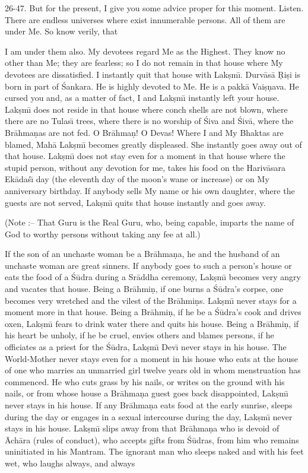 26-47. But for the present, I give you some advice proper for this moment. Listen. There are endless universes where exist innumerable persons. All of them are under Me. So know verily, that

I am under them also. My devotees regard Me as the Highest. They know no other than Me; they are fearless; so I do not remain in that house where My devotees are dissatisfied. I instantly quit that house with Lak\d{s}m\={\i}. Durv\=as\=a \d{R}i\d{s}i is born in part of \'Sankara. He is highly devoted to Me. He is a pakk\=a Vai\d{s}\d{n}ava. He cursed you and, as a matter of fact, I and Lak\d{s}m\={\i} instantly left your house.
Lak\d{s}m\={\i} does not reside in that house where conch shells are not blown, where there are no Tulas\={\i} trees, where there is no worship of \'Siva and \'Siv\=a, where the Br\=ahma\d{n}as are not fed. O Br\=ahma\d{n}! O Devas! Where I and My Bhaktas are blamed, Mah\=a Lak\d{s}m\={\i} becomes greatly displeased. She instantly goes away out of that house. Lak\d{s}m\={\i} does not stay even for a moment in that house where the stupid person, without any devotion for me, takes his food on the Hariv\=asara Ek\=ada\'s\={\i} day (the eleventh day of the moon's wane or increase) or on My anniversary birthday. If anybody sells My name or his own daughter, where the guests are not served, Lak\d{s}m\={\i} quits that house instantly and goes away.

(Note :-- That Guru is the Real Guru, who, being capable, imparts the name of God to worthy persons without taking any fee at all.)

If the son of an unchaste woman be a Br\=ahma\d{n}a, he and the husband of an unchaste woman are great sinners. If anybody goes to such a person's house or eats the food of a \'S\=udra during a Sr\=addha ceremony, Lak\d{s}m\={\i} becomes very angry and vacates that house. Being a Br\=ahmi\d{n}, if one burns a \'S\=udra's corpse, one becomes very wretched and the vilest of the Br\=ahmi\d{n}s. Lak\d{s}m\={\i} never stays for a moment more in that house. Being a Br\=ahmi\d{n}, if he be a \'S\=udra's cook and drives oxen, Lak\d{s}m\={\i} fears to drink water there and quits his house. Being a Br\=ahmi\d{n}, if his heart be unholy, if he be cruel, envies others and blames persons, if he officiates as a priest for the \'S\=udra, Lak\d{s}m\={\i} Dev\={\i} never stays in his house. The World-Mother never stays even for a moment in his house who eats at the house of one who marries an unmarried girl twelve years old in whom menstruation has commenced. He who cuts grass by his nails, or writes on the ground with his nails, or from whose house a Br\=ahma\d{n}a guest goes back disappointed, Lak\d{s}m\={\i} never stays in his house. If any Br\=ahma\d{n}a eats food at the early sunrise, sleeps during the day or engages in a sexual intercourse during the day, Lak\d{s}m\={\i} never stays in his house. Lak\d{s}m\={\i} slips away from that Br\=ahma\d{n}a who is devoid of \=Ach\=ara (rules of conduct), who accepts gifts from \'S\=udras, from him who remains uninitiated in his Mantram. The ignorant man who sleeps naked and with his feet wet, who laughs always, and always

